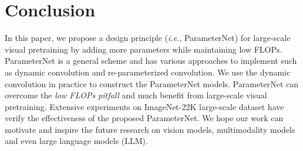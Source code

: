 \documentclass{article}
\newcommand{\ie}{\emph{i.e.}}
\begin{document}
\section{Conclusion}
In this paper, we propose a design principle (\ie, ParameterNet) for large-scale visual pretraining by adding more parameters while maintaining low FLOPs.
ParameterNet is a general scheme and has various approaches to implement such as dynamic convolution and re-parameterized convolution. We use the dynamic convolution in practice to construct the ParameterNet models. ParameterNet can overcome the \emph{low FLOPs pitfall} and much benefit from large-scale visual pretraining.
Extensive experiments on ImageNet-22K large-scale dataset have verify the effectiveness of the proposed ParameterNet.
We hope our work can motivate and inspire the future research on vision models, multimodality models and even large language models (LLM).
\end{document}
